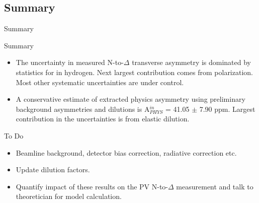 \documentclass[xcolor=x11names,compress,8pt]{beamer}
\renewcommand{\(}{\begin{columns}}
\renewcommand{\)}{\end{columns}}
\newcommand{\<}[1]{\begin{column}{#1}}
\renewcommand{\>}{\end{column}}
\begin{document}
\subsection{Summary}
\begin{frame}{Summary}



\begin{block}{Summary}

\fontsize{8pt}{7.2}\selectfont
\begin{itemize}
\item The uncertainty in measured N-to-$\Delta$ transverse asymmetry is dominated by statistics for in hydrogen. Next largest contribution comes from polarization. Most other systematic uncertainties are under control. 
\item A conservative estimate of extracted physics asymmetry using preliminary background asymmetries and dilutions is A$_{PHYS}^{in}$ = 41.05 $\pm$ 7.90 ppm. Largest contribution in the uncertainties is from elastic dilution.
\end{itemize}

\end{block}

\pause

\hfill

\begin{block}{To Do}

\fontsize{8pt}{7.2}\selectfont
\begin{itemize}
\item Beamline background, detector bias correction, radiative correction etc.
\item Update dilution factors.
\item Quantify impact of these results on the PV N-to-$\Delta$ measurement and talk to theoretician for model calculation.
\end{itemize}

\end{block}

\end{frame}

\appendix
\end{document}
